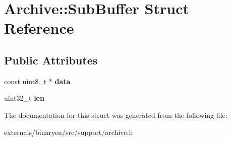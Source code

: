 \hypertarget{struct_archive_1_1_sub_buffer}{}\section{Archive\+:\+:Sub\+Buffer Struct Reference}
\label{struct_archive_1_1_sub_buffer}
\subsection*{Public Attributes}
\begin{DoxyCompactItemize}
\item 
\mbox{\label{struct_archive_1_1_sub_buffer_ab137106ef3f16e83e60745f872aaa90a}} 
const uint8\+\_\+t $\ast$ {\bfseries data}
\item 
\mbox{\label{struct_archive_1_1_sub_buffer_afe08c0d86ddcfb12ab3fe68ae32a67f1}} 
uint32\+\_\+t {\bfseries len}
\end{DoxyCompactItemize}


The documentation for this struct was generated from the following file\+:\begin{DoxyCompactItemize}
\item 
externals/binaryen/src/support/archive.\+h\end{DoxyCompactItemize}

